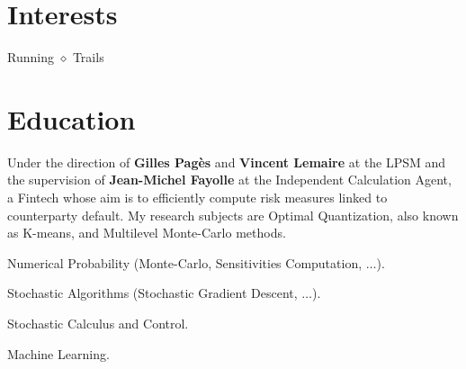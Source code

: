 \documentclass[]{deedy-resume-openfont}
\begin{document}
\begin{minipage}[t]{0.33\textwidth}

\vspace{\topsep}
\vspace{\topsep}
\section{Interests}
Running $\diamond$ Trails

%
%

\end{minipage} 
\hfill
\begin{minipage}[t]{0.64\textwidth} 



\section{Education}

Under the direction of \textbf{Gilles Pagès} and \textbf{Vincent Lemaire} at the LPSM and the supervision of \textbf{Jean-Michel Fayolle} at the Independent Calculation Agent, a Fintech whose aim is to efficiently compute risk measures linked to counterparty default. My research subjects are Optimal Quantization, also known as K-means, and Multilevel Monte-Carlo methods.
\sectionsep


\vspace{\topsep}
\begin{tightemize}
	\item Numerical Probability (Monte-Carlo, Sensitivities Computation, $\dots$).
	\item Stochastic Algorithms (Stochastic Gradient Descent, $\dots$).
	\item Stochastic Calculus and Control.
	\item Machine Learning.
\end{tightemize}
\sectionsep



\end{minipage}
\end{document}
